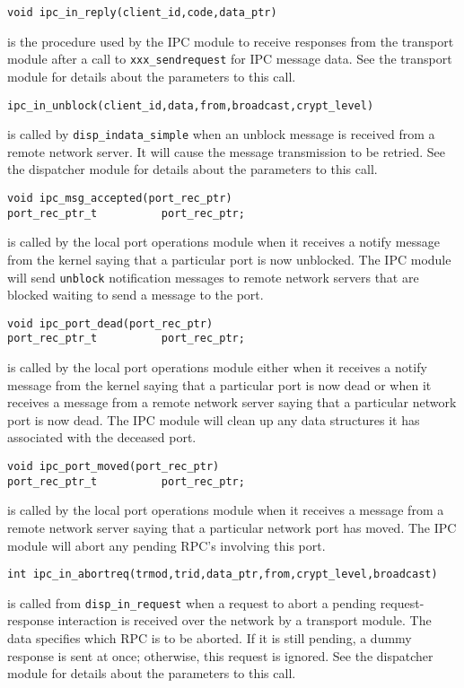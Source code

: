 \begin{verbatim}
void ipc_in_reply(client_id,code,data_ptr)
\end{verbatim}
is the procedure used by the IPC module to receive responses from the
transport module after a call to \verb"xxx_sendrequest" for IPC
message data.  See the transport module for details about the
parameters to this call.

\begin{verbatim}
ipc_in_unblock(client_id,data,from,broadcast,crypt_level)
\end{verbatim}
is called by \verb"disp_indata_simple" when an unblock message is received
from a remote network server.  It will cause the message transmission to be
retried.  See the dispatcher module for details about the parameters to this
call.

\begin{verbatim}
void ipc_msg_accepted(port_rec_ptr)
port_rec_ptr_t          port_rec_ptr;
\end{verbatim}
is called by the local port operations module when it receives a
notify message from the kernel saying that a particular port is now
unblocked.  The IPC module will send \verb"unblock" notification
messages to remote network servers that are blocked waiting to send a
message to the port.

\begin{verbatim}
void ipc_port_dead(port_rec_ptr)
port_rec_ptr_t          port_rec_ptr;
\end{verbatim}
is called by the local port operations module either when it receives a
notify message from the kernel saying that a particular port is now dead or
when it receives a message from a remote network server saying that a
particular network port is now dead.  The IPC module will clean up any data
structures it has associated with the deceased port.

\begin{verbatim}
void ipc_port_moved(port_rec_ptr)
port_rec_ptr_t          port_rec_ptr;
\end{verbatim}
is called by the local port operations module
when it receives a message from a remote network server saying that a
particular network port has moved.  The IPC module will abort any
pending RPC's involving this port.

\begin{verbatim}
int ipc_in_abortreq(trmod,trid,data_ptr,from,crypt_level,broadcast)
\end{verbatim}
is called from \verb"disp_in_request" when a request to abort a
pending request-response interaction is received over the network by a
transport module. The data specifies which RPC is to be aborted. If it
is still pending, a dummy response is sent at once; otherwise, this
request is ignored.  See the dispatcher module for details about the
parameters to this call.

